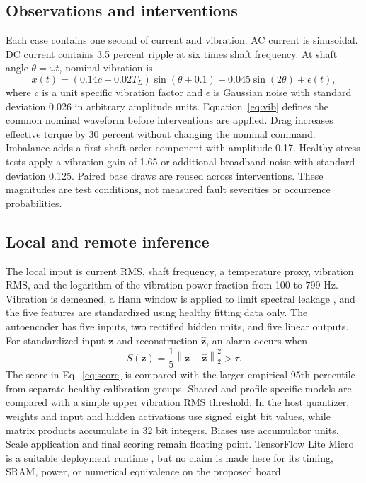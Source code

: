 \documentclass[10pt,twocolumn]{article}
\newcommand{\vect}[1]{\boldsymbol{#1}}
\begin{document}
\subsection{Observations and interventions}
Each case contains one second of current and vibration. AC current is sinusoidal. DC current contains 3.5 percent ripple at six times shaft frequency. At shaft angle $\theta=\omega t$, nominal vibration is
\begin{equation}
x(t)=\left(0.14c+0.02T_L\right)\sin(\theta+0.1)
+0.045\sin(2\theta)+\epsilon(t),
\label{eq:vib}
\end{equation}
where $c$ is a unit specific vibration factor and $\epsilon$ is Gaussian noise with standard deviation 0.026 in arbitrary amplitude units. Equation~\eqref{eq:vib} defines the common nominal waveform before interventions are applied. Drag increases effective torque by 30 percent without changing the nominal command. Imbalance adds a first shaft order component with amplitude 0.17. Healthy stress tests apply a vibration gain of 1.65 or additional broadband noise with standard deviation 0.125. Paired base draws are reused across interventions. These magnitudes are test conditions, not measured fault severities or occurrence probabilities.

\subsection{Local and remote inference}
The local input is current RMS, shaft frequency, a temperature proxy, vibration RMS, and the logarithm of the vibration power fraction from 100 to 799 Hz. Vibration is demeaned, a Hann window is applied to limit spectral leakage \cite{harris1978}, and the five features are standardized using healthy fitting data only. The autoencoder has five inputs, two rectified hidden units, and five linear outputs. For standardized input $\vect{z}$ and reconstruction $\hat{\vect{z}}$, an alarm occurs when
\begin{equation}
S(\vect{z})=\frac{1}{5}\left\lVert\vect{z}-\hat{\vect{z}}\right\rVert_2^2>\tau .
\label{eq:score}
\end{equation}
The score in Eq.~\eqref{eq:score} is compared with the larger empirical 95th percentile from separate healthy calibration groups. Shared and profile specific models are compared with a simple upper vibration RMS threshold. In the host quantizer, weights and input and hidden activations use signed eight bit values, while matrix products accumulate in 32 bit integers. Biases use accumulator units. Scale application and final scoring remain floating point. TensorFlow Lite Micro is a suitable deployment runtime \cite{david2021}, but no claim is made here for its timing, SRAM, power, or numerical equivalence on the proposed board.
\end{document}

